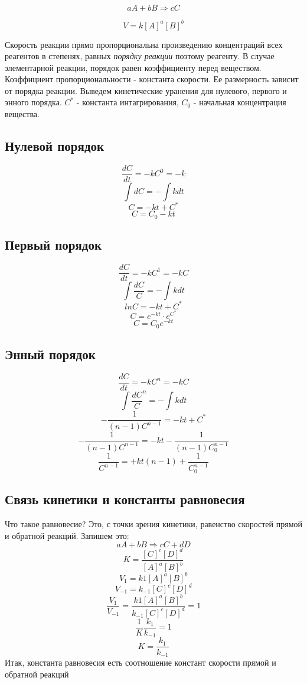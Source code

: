 \documentclass[14pt,a4paper]{scrartcl}
\begin{document}
$$aA + bB \Rightarrow cC$$

$$V = k \left[A\right]^a\left[B\right]^b$$


Скорость реакции прямо пропорциональна произведению концентраций всех реагентов в степенях, равных \emph{порядку реакции} поэтому реагенту. В случае элементарной реакции, порядок равен коэффициенту перед веществом. Коэффициент пропорциональности - константа скорости. Ее размерность зависит от порядка реакции. Выведем кинетические уранения для нулевого, первого и энного порядка. $C^*$ - константа интагрирования, $C_0$ - начальная концентрация вещества. 

\subsection*{Нулевой порядок}
$$\frac{dC}{dt} = -kC^0 = -k$$
$$\int dC = -\int kdt$$
$$C = -kt + C^*$$
$$C = C_0 - kt$$

\subsection*{Первый порядок}
$$\frac{dC}{dt} = -kC^1 = -kC$$
$$\int \frac{dC}C = -\int kdt$$
$$ln C = -kt + C^*$$
$$C = e^{-kt}\cdot e^{C^*}$$
$$C = C_0e^{-kt}$$

\subsection*{Энный порядок}
$$\frac{dC}{dt} = -kC^n = -kC$$
$$\int \frac{dC}C^n = -\int kdt$$
$$-\frac{1}{(n-1)C^{n-1}} = -kt + C^*$$
$$-\frac{1}{(n-1)C^{n-1}} = -kt - \frac{1}{(n-1)C_0^{n-1}}$$
$$ \frac 1{C^{n-1}} = +kt(n-1) + \frac1{C_0^{n-1}}$$

\subsection*{Связь кинетики и константы равновесия}

Что такое равновесие? Это, с точки зрения кинетики, равенство скоростей прямой и обратной реакций. Запишем это:
$$aA + bB \Rightarrow cC + dD$$
$$K =\frac{\left[C\right]^c\left[D\right]^d}{\left[A\right]^a\left[B\right]^b}$$
$$V_1 = k1 \left[A\right]^a\left[B\right]^b$$
$$V_{-1} = k_{-1}\left[C\right]^c\left[D\right]^d$$
$$\frac{V_1}{V_{-1}} = \frac{k1 \left[A\right]^a\left[B\right]^b}{k_{-1}\left[C\right]^c\left[D\right]^d} = 1$$
$$\frac 1K\frac{k_1}{k_{-1}} = 1$$
$$K = \frac{k_1}{k_{-1}}$$
Итак, константа равновесия есть соотношение констант скорости прямой и обратной реакций
\end{document}
